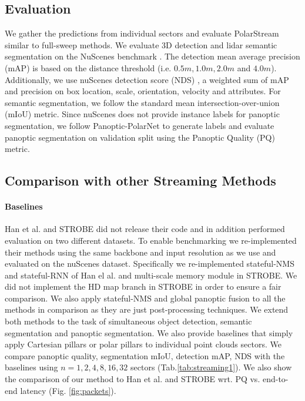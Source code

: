 \documentclass{article}
\begin{document}
\subsection{Evaluation}\vspace{-2mm}
We gather the predictions from individual sectors and evaluate PolarStream similar to full-sweep methods. We evaluate 3D detection and lidar semantic segmentation on the NuScenes benchmark \cite{caesar2019nuscenes}. The detection mean average precision (mAP) is based on the distance threshold (i.e. $0.5m, 1.0m, 2.0m$ and $4.0m$). Additionally, we use nuScenes detection score (NDS) \cite{caesar2019nuscenes}, a weighted sum of mAP and precision on box location, scale, orientation, velocity and attributes. For semantic segmentation, we follow the standard mean intersection-over-union (mIoU) metric. Since nuScenes does not provide instance labels for panoptic segmentation, we follow Panoptic-PolarNet \cite{zhou2021panoptic} to generate labels and evaluate panoptic segmentation on validation split using the Panoptic Quality (PQ) metric.

\subsection{Comparison with other Streaming Methods}

\paragraph{Baselines}
Han et al.\cite{han2020streaming} and STROBE\cite{frossard2020strobe} did not release their code and in addition performed evaluation on two different datasets. To enable benchmarking we re-implemented their methods using the same backbone and input resolution as we use and evaluated on the nuScenes dataset. Specifically we re-implemented stateful-NMS and stateful-RNN of Han el al. and multi-scale memory module in STROBE. We did not implement the HD map branch in STROBE in order to ensure a fair comparison. We also apply stateful-NMS and global panoptic fusion to all the methods in comparison as they are just post-processing techniques. We extend both methods to the task of simultaneous object detection, semantic segmentation and panoptic segmentation. We also provide baselines that simply apply Cartesian pillars or polar pillars to individual point clouds sectors. We compare panoptic quality, segmentation mIoU, detection mAP, NDS with the baselines using $n=1,2,4,8,16,32$ sectors (Tab.\ref{tab:streaming1}). We also show the comparison of our method to Han et al. and STROBE wrt. PQ vs. end-to-end latency (Fig. \ref{fig:packets}).
\end{document}
